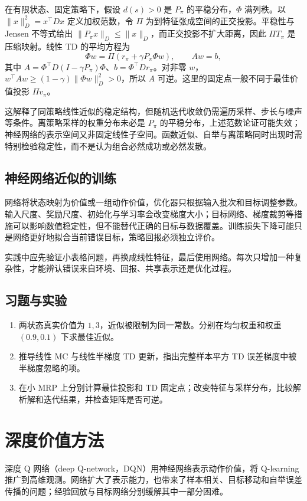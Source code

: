 \documentclass[UTF8,12pt,a4paper,fontset=fandol]{ctexbook}
\begin{document}
在有限状态、固定策略下，假设 $d(s)>0$ 是 $P_\pi$ 的平稳分布，$\Phi$ 满列秩。以 $\|x\|_D^2=x^\top Dx$ 定义加权范数，令 $\Pi$ 为到特征张成空间的正交投影。平稳性与 Jensen 不等式给出 $\|P_\pi x\|_D\leq\|x\|_D$，而正交投影不扩大距离，因此 $\Pi T_\pi$ 是压缩映射。线性 TD 的平均方程为
\[
\Phi w=\Pi(r_\pi+\gamma P_\pi\Phi w),\qquad
Aw=b,
\]
其中 $A=\Phi^\top D(I-\gamma P_\pi)\Phi$、$b=\Phi^\top Dr_\pi$。对非零 $w$，$w^\top Aw\geq(1-\gamma)\|\Phi w\|_D^2>0$，所以 $A$ 可逆。这里的固定点一般不同于最佳价值投影 $\Pi v_\pi$。

这解释了同策略线性近似的稳定结构，但随机迭代收敛仍需遍历采样、步长与噪声等条件。离策略采样的权重分布未必是 $P_\pi$ 的平稳分布，上述范数论证可能失效；神经网络的表示空间又非固定线性子空间。函数近似、自举与离策略同时出现时需特别检验稳定性，而不是认为组合必然成功或必然发散。

\section{神经网络近似的训练}

网络将状态映射为价值或一组动作价值，优化器只根据输入批次和目标调整参数。输入尺度、奖励尺度、初始化与学习率会改变梯度大小；目标网络、梯度裁剪等措施可以影响数值稳定性，但不能替代正确的目标与数据覆盖。训练损失下降可能只是网络更好地拟合当前错误目标，策略回报必须独立评价。

实践中应先验证小表格问题，再换成线性特征，最后使用网络。每次只增加一种复杂性，才能辨认错误来自环境、回报、共享表示还是优化过程。

\section{习题与实验}
\begin{enumerate}
\item 两状态真实价值为 $1,3$，近似被限制为同一常数。分别在均匀权重和权重 $(0.9,0.1)$ 下求最佳近似。
\item 推导线性 MC 与线性半梯度 TD 更新，指出完整样本平方 TD 误差梯度中被半梯度忽略的项。
\item 在小 MRP 上分别计算最佳投影和 TD 固定点；改变特征与采样分布，比较解析解和迭代结果，并检查矩阵是否可逆。
\end{enumerate}

\chapter{深度价值方法}
\label{ch:rl-dqn}

深度 Q 网络（deep Q-network，DQN）用神经网络表示动作价值，将 Q-learning 推广到高维观测\cite{mnih-dqn}。网络扩大了表示能力，也带来了样本相关、目标移动和自举误差传播的问题；经验回放与目标网络分别缓解其中一部分困难。
\end{document}
